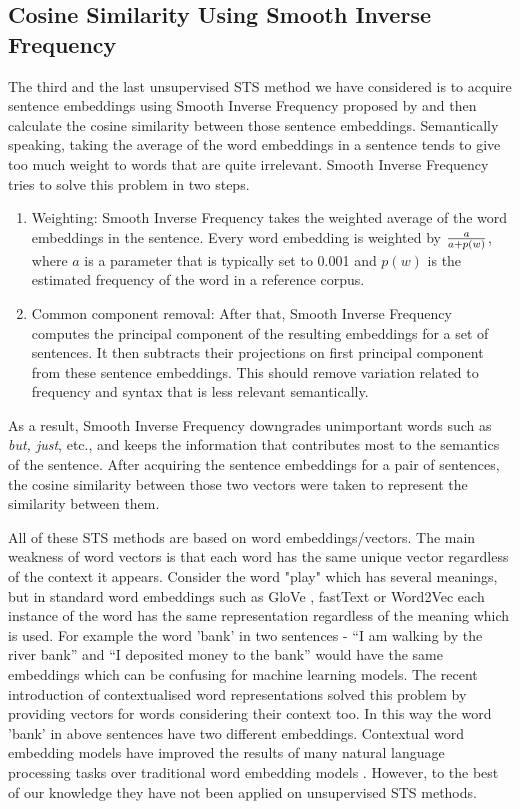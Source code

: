 \subsection{Cosine Similarity Using Smooth Inverse Frequency}
The third and the last unsupervised STS method we have considered is to acquire sentence embeddings using Smooth Inverse Frequency proposed by \citet{DBLP:conf/iclr/AroraLM17} and then calculate the cosine similarity between those sentence embeddings. Semantically speaking, taking the average of the word embeddings in a sentence tends to give too much weight to words that are quite irrelevant. Smooth Inverse Frequency tries to solve this problem in two steps. 

\begin{enumerate}
	\item Weighting: Smooth Inverse Frequency takes the weighted average of the word embeddings in the sentence. Every word embedding is weighted by $a\over{a + p(w)}$, where $a$ is a parameter that is typically set to 0.001 and $p(w)$ is the estimated frequency of the word in a reference corpus. 
	\item Common component removal: After that, Smooth Inverse Frequency computes the principal component of the resulting embeddings for a set of sentences. It then subtracts their projections on first principal component from these sentence embeddings. This should remove variation related to frequency and syntax that is less relevant semantically.
\end{enumerate}

As a result, Smooth Inverse Frequency downgrades unimportant words such as \emph{but, just}, etc., and keeps the information that contributes most to the semantics of the sentence. After acquiring the sentence embeddings for a pair of sentences, the cosine similarity between those two vectors were taken to represent the similarity between them. 

All of these STS methods are based on word embeddings/vectors. The main weakness of word vectors is that each word has the same unique vector regardless of the context it appears. Consider the word "play" which has several meanings, but in standard word embeddings such as GloVe \cite{pennington2014glove}, fastText \cite{mikolov-etal-2018-advances} or Word2Vec  \cite{10.5555/2999792.2999959} each instance of the word has the same representation regardless of the meaning which is used. For example the word 'bank' in two sentences - ``I am walking by the river bank'' and ``I deposited money to the bank'' would have the same embeddings which can be confusing for machine learning models. The recent introduction of contextualised word representations solved this problem by providing vectors for words considering their context too. In this way the word 'bank' in above sentences have two different embeddings. Contextual word embedding models have improved the results of many natural language processing tasks over traditional word embedding models \cite{peters-etal-2018-deep, devlin-etal-2019-bert}. However, to the best of our knowledge they have not been applied on unsupervised STS methods.

